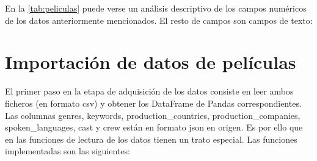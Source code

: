 En la \autoref{tab:peliculas} puede verse un análisis descriptivo de los campos numéricos de los datos anteriormente mencionados. El resto de campos son campos de texto:

\begin{table}[h]
\centering
{}
\caption{Análisis descriptivo de las variables numéricas de los datos de entrada. Se muestra para cada campo el número de filas informadas, la media, la desviación estándar y los cuartiles.}
\label{tab:peliculas}
\end{table}

\newpage
\section{Importación de datos de películas}

El primer paso en la etapa de adquisición de los datos consiste en leer ambos ficheros (en formato csv) y obtener los DataFrame de Pandas correspondientes. Las columnas genres, keywords, production\_countries, production\_companies, spoken\_languages, cast y crew están en formato json en origen. Es por ello que en las funciones de lectura de los datos tienen un trato especial. Las funciones implementadas son las siguientes:

